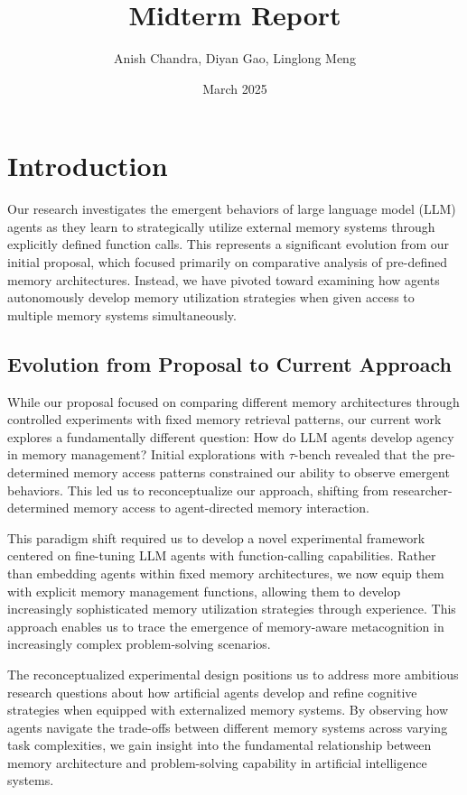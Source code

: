 \documentclass{article}
\title{\Large\textbf{Midterm Report}}
\author{Anish Chandra, Diyan Gao, Linglong Meng}
\date{March 2025}
\begin{document}
\maketitle


\section{Introduction}

Our research investigates the emergent behaviors of large language model (LLM) agents as they learn to strategically utilize external memory systems through explicitly defined function calls. This represents a significant evolution from our initial proposal, which focused primarily on comparative analysis of pre-defined memory architectures. Instead, we have pivoted toward examining how agents autonomously develop memory utilization strategies when given access to multiple memory systems simultaneously.

\subsection{Evolution from Proposal to Current Approach}

While our proposal focused on comparing different memory architectures through controlled experiments with fixed memory retrieval patterns, our current work explores a fundamentally different question: How do LLM agents develop agency in memory management? Initial explorations with $\tau$-bench revealed that the pre-determined memory access patterns constrained our ability to observe emergent behaviors. This led us to reconceptualize our approach, shifting from researcher-determined memory access to agent-directed memory interaction.

This paradigm shift required us to develop a novel experimental framework centered on fine-tuning LLM agents with function-calling capabilities. Rather than embedding agents within fixed memory architectures, we now equip them with explicit memory management functions, allowing them to develop increasingly sophisticated memory utilization strategies through experience. This approach enables us to trace the emergence of memory-aware metacognition in increasingly complex problem-solving scenarios.

The reconceptualized experimental design positions us to address more ambitious research questions about how artificial agents develop and refine cognitive strategies when equipped with externalized memory systems. By observing how agents navigate the trade-offs between different memory systems across varying task complexities, we gain insight into the fundamental relationship between memory architecture and problem-solving capability in artificial intelligence systems.
\end{document}
